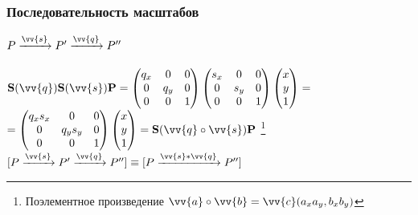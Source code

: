 \documentclass[10pt]{beamer}
\begin{document}
\begin{frame}\frametitle{Последовательность масштабов}

	$	P \xrightarrow{\vv{s}} P' \xrightarrow{\vv{q}} P'' $ \\ ~ \\ \pause
	$	
	    \textbf{S}(\vv{q})\textbf{S}(\vv{s})\textbf{P}=
		\begin{pmatrix}
			q_x&0&0\\
			0&q_y&0\\
			0&0&1
		\end{pmatrix}
		\begin{pmatrix}
			s_x&0&0\\
			0&s_y&0\\
			0&0&1
		\end{pmatrix}
	    \begin{pmatrix}
			x\\
			y\\
			1
		\end{pmatrix}
		=
	$ \\[1em]  \pause
	\hspace{2cm} $   =
		\begin{pmatrix}
			q_xs_x&0&0\\
			0&q_ys_y&0\\
			0&0&1
		\end{pmatrix}
	    \begin{pmatrix}
			x\\
			y\\
			1
		\end{pmatrix}
		= \textbf{S}(\vv{q}\circ\vv{s})\textbf{P}
	$ \footnote<3->{Поэлементное произведение $\vv{a}\circ\vv{b}=\vv{c}(a_xa_y,b_xb_y)$}\\[1em]
	
	
	
	$  [	P \xrightarrow{\vv{s}} P' \xrightarrow{\vv{q}} P'' ] \equiv [  P \xrightarrow{\vv{s}*\vv{q}} P''    ]   $
	

\end{frame}
\end{document}
